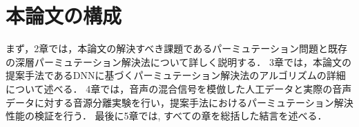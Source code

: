 \section{本論文の構成}
まず，2章では，本論文の解決すべき課題であるパーミュテーション問題と既存の深層パーミュテーション解決法について詳しく説明する．
3章では，本論文の提案手法であるDNNに基づくパーミュテーション解決法のアルゴリズムの詳細について述べる．
4章では，音声の混合信号を模倣した人工データと実際の音声データに対する音源分離実験を行い，提案手法におけるパーミュテーション解決性能の検証を行う．
最後に5章では, すべての章を総括した結言を述べる．


